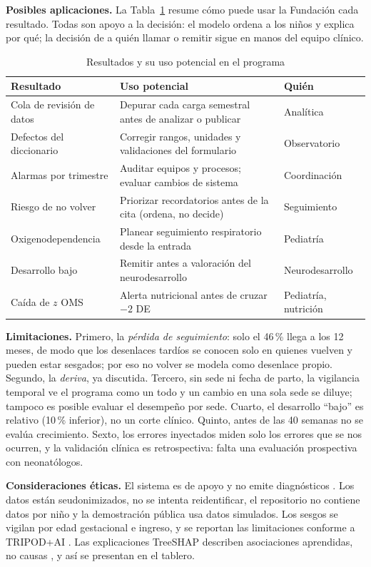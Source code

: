 \textbf{Posibles aplicaciones.} La Tabla~\ref{tab:usos} resume cómo puede usar la Fundación cada resultado. Todas son apoyo a la decisión: el modelo ordena a los niños y explica por qué; la decisión de a quién llamar o remitir sigue en manos del equipo clínico.

\begin{table}[t]
\centering
\caption{Resultados y su uso potencial en el programa}
\label{tab:usos}
\footnotesize
\setlength{\tabcolsep}{3pt}
\begin{tabularx}{\columnwidth}{@{}>{\raggedright\arraybackslash}p{2.3cm}>{\raggedright\arraybackslash}X>{\raggedright\arraybackslash}p{1.7cm}@{}}
\toprule
\textbf{Resultado} & \textbf{Uso potencial} & \textbf{Quién} \\
\midrule
Cola de revisión de datos & Depurar cada carga semestral antes de analizar o publicar & Analítica \\
Defectos del diccionario & Corregir rangos, unidades y validaciones del formulario & Observatorio \\
Alarmas por trimestre & Auditar equipos y procesos; evaluar cambios de sistema & Coordinación \\
Riesgo de no volver & Priorizar recordatorios antes de la cita (ordena, no decide) & Seguimiento \\
Oxigenodependencia & Planear seguimiento respiratorio desde la entrada & Pediatría \\
Desarrollo bajo & Remitir antes a valoración del neurodesarrollo & Neurodesarrollo \\
Caída de $z$ OMS & Alerta nutricional antes de cruzar $-2$ DE & Pediatría, nutrición \\
\bottomrule
\end{tabularx}
\end{table}

\textbf{Limitaciones.} Primero, la \emph{pérdida de seguimiento}: solo el 46\,\% llega a los 12 meses, de modo que los desenlaces tardíos se conocen solo en quienes vuelven y pueden estar sesgados; por eso no volver se modela como desenlace propio. Segundo, la \emph{deriva}, ya discutida. Tercero, sin sede ni fecha de parto, la vigilancia temporal ve el programa como un todo y un cambio en una sola sede se diluye; tampoco es posible evaluar el desempeño por sede. Cuarto, el desarrollo ``bajo'' es relativo (10\,\% inferior), no un corte clínico. Quinto, antes de las 40 semanas no se evalúa crecimiento. Sexto, los errores inyectados miden solo los errores que se nos ocurren, y la validación clínica es retrospectiva: falta una evaluación prospectiva con neonatólogos.

\textbf{Consideraciones éticas.} El sistema es de apoyo y no emite diagnósticos \cite{salih2024}. Los datos están seudonimizados, no se intenta reidentificar, el repositorio no contiene datos por niño y la demostración pública usa datos simulados. Los sesgos se vigilan por edad gestacional e ingreso, y se reportan las limitaciones conforme a TRIPOD+AI \cite{collins2024}. Las explicaciones TreeSHAP describen asociaciones aprendidas, no causas \cite{ghassemi2021}, y así se presentan en el tablero.
